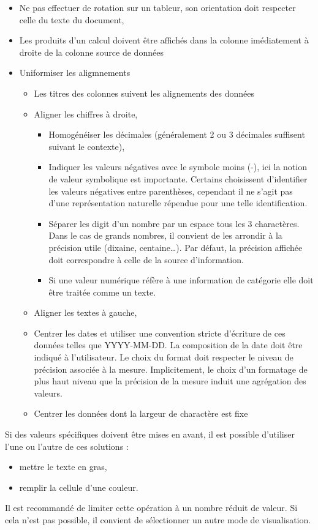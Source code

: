 \documentclass[a4paper,12pt]{article}
\begin{document}
\begin{multicols}{2}
\begin{itemize}
\begin{itemize}
\end{itemize}
\item Ne pas effectuer de rotation sur un tableur, son orientation doit respecter celle du texte du document,
\item Les produits d'un calcul doivent être affichés dans la colonne imédiatement à droite de la colonne source de données
\item Uniformiser les aligmnements
\begin{itemize}
\item Les titres des colonnes suivent les alignements des données
\item Aligner les chiffres à droite,
\begin{itemize}
\item Homogénéiser les décimales (généralement 2 ou 3 décimales suffisent suivant le contexte),
\item Indiquer les valeurs négatives avec le symbole \og moins\fg{} (-), ici la notion de valeur symbolique est importante. Certains choisissent d'identifier les valeurs négatives entre parenthèses, cependant il ne s'agit pas d'une représentation naturelle répendue pour une telle identification.
\item Séparer les digit d'un nombre par un espace tous les 3 charactères. Dans le cas de grands nombres, il convient de les arrondir à la précision utile (dixaine, centaine\ldots{}). Par défaut, la précision affichée doit correspondre à celle de la source d'information.
\item Si une valeur numérique réfère à une information de catégorie elle doit être traitée comme un texte.
\end{itemize}
\item Aligner les textes à gauche,
\item Centrer les dates et utiliser une convention stricte d'écriture de ces données telles que \og YYYY-MM-DD\fg{}.\autocite{ISO8601-1DateHeureRepresentations2019} La composition de la date doit être indiqué à l'utilisateur. Le choix du format doit respecter le niveau de précision associée à la mesure. Implicitement, le choix d'un formatage de plus haut niveau que la précision de la mesure induit une agrégation des valeurs.
\item Centrer les données dont la largeur de charactère est fixe
\end{itemize}
\end{itemize}

Si des valeurs spécifiques doivent être mises en avant, il est possible d'utiliser l'une ou l'autre de ces solutions :
\begin{itemize}
\item mettre le texte en gras,
\item remplir la cellule d'une couleur.
\end{itemize}
Il est recommandé de limiter cette opération à un nombre réduit de valeur. Si cela n'est pas possible, il convient de sélectionner un autre mode de visualisation.


\end{multicols}
\end{document}
